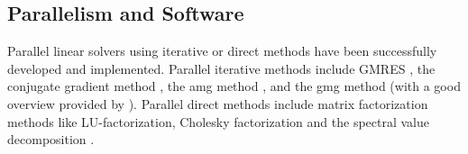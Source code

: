

\subsection{Parallelism and Software}

Parallel linear solvers using iterative or direct methods have been successfully developed and implemented. Parallel iterative methods include GMRES \citep{saad1986gmres}, the conjugate gradient method \citep{hestenes1952methods}, the \gls{amg} method \citep{yang2002boomeramg}, and the \gls{gmg} method \citep{sundar2012parallel} (with a good overview provided by \citet{chow2006survey}). Parallel direct methods include matrix factorization methods like LU-factorization, Cholesky factorization and the spectral value decomposition \citep{donfack2015survey, demmel1999asynchronous, gupta1997highly}.

